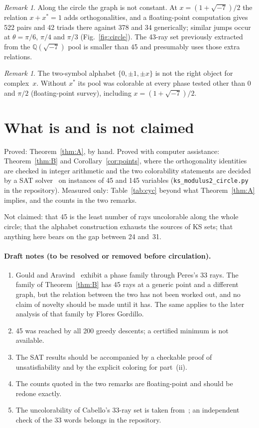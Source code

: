\documentclass[11pt,a4paper]{article}
\theoremstyle{remark}
\newtheorem{remark}[theorem]{Remark}
\newcommand{\Q}{\mathbb{Q}}
\begin{document}
\begin{remark}
Along the circle the graph is not constant.  At $x=(1+\sqrt{-7})/2$ the relation $x+x^{*}=1$
adds orthogonalities, and a floating-point computation gives 522 pairs and 42 triads there against
378 and 34 generically; similar jumps occur at $\theta=\pi/6$, $\pi/4$ and $\pi/3$
(Fig.~\ref{fig:circle}).  The 43-ray set previously extracted from the $\Q(\sqrt{-7})$ pool is
smaller than 45 and presumably uses those extra relations.
\end{remark}

\begin{remark}
The two-symbol alphabet $\{0,\pm1,\pm x\}$ is not the right object for complex~$x$.  Without
$x^{*}$ its pool was colorable at every phase tested other than $0$ and $\pi/2$ (floating-point
survey), including $x=(1+\sqrt{-7})/2$.
\end{remark}

\section{What is and is not claimed}

Proved: Theorem~\ref{thm:A}, by hand.  Proved with computer assistance: Theorem~\ref{thm:B} and
Corollary~\ref{cor:points}, where the orthogonality identities are checked in integer arithmetic
and the two colorability statements are decided by a SAT
solver~\cite{AudemardSimon2018} on instances of 45 and 145 variables
(\texttt{ks\_modulus2\_circle.py} in the repository).  Measured only: Table~\ref{tab:cyc} beyond
what Theorem~\ref{thm:A} implies, and the counts in the two remarks.

Not claimed: that 45 is the least number of rays uncolorable along the whole circle; that the
alphabet construction exhausts the sources of KS sets; that anything here bears on the gap
between 24 and~31.

\paragraph{Draft notes (to be resolved or removed before circulation).}
\begin{enumerate}
\item Gould and Aravind~\cite{GouldAravind2010} exhibit a phase family through Peres's 33 rays.
The family of Theorem~\ref{thm:B} has 45 rays at a generic point and a different graph, but the
relation between the two has not been worked out, and no claim of novelty should be made until it
has.  The same applies to the later analysis of that family by Flores Gordillo.
\item 45 was reached by all 200 greedy descents; a certified minimum is not available.
\item The SAT results should be accompanied by a checkable proof of unsatisfiability and by the
explicit coloring for part~(ii).
\item The counts quoted in the two remarks are floating-point and should be redone exactly.
\item The uncolorability of Cabello's 33-ray set is taken from~\cite{Cabello2025simplest}; an
independent check of the 33 words belongs in the repository.
\end{enumerate}
\end{document}
